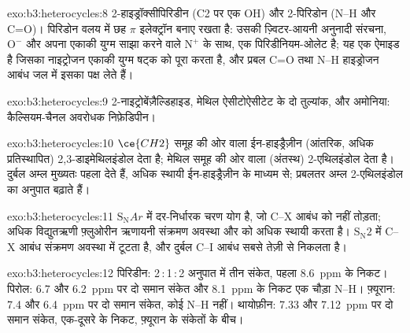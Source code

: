 \begin{solution}{exo:b3:heterocycles:8}
2-हाइड्रॉक्सीपिरिडीन (C2 पर एक OH) और 2-पिरिडोन (N--H और C=O)। पिरिडोन वलय में छह
$\pi$ इलेक्ट्रॉन बनाए रखता है: उसकी ज़्विटर-आयनी अनुनादी संरचना, $\mathrm{O^-}$ और अपना एकाकी युग्म साझा करने वाले
$\mathrm{N^+}$ के साथ, एक पिरिडीनियम-ओलेट है; यह एक ऐमाइड है जिसका
नाइट्रोजन एकाकी युग्म षट्क को पूरा करता है, और प्रबल C=O तथा N--H
हाइड्रोजन आबंध जल में इसका पक्ष लेते हैं।
\end{solution}

\begin{solution}{exo:b3:heterocycles:9}
2-नाइट्रोबेंज़ैल्डिहाइड, मेथिल ऐसीटोऐसीटेट के दो तुल्यांक, और अमोनिया:
कैल्सियम-चैनल अवरोधक निफ़ेडिपीन।
\end{solution}

\begin{solution}{exo:b3:heterocycles:10}
$\ce{CH2}$ समूह की ओर वाला ईन-हाइड्रैज़ीन (आंतरिक, अधिक प्रतिस्थापित)
2,3-डाइमेथिलइंडोल देता है; मेथिल समूह की ओर वाला (अंतस्थ) 2-एथिलइंडोल देता है।
दुर्बल अम्ल मुख्यतः पहला देते हैं, अधिक स्थायी ईन-हाइड्रैज़ीन के माध्यम से;
प्रबलतर अम्ल 2-एथिलइंडोल का अनुपात बढ़ाते हैं।
\end{solution}

\begin{solution}{exo:b3:heterocycles:11}
$\mathrm S_\mathrm NAr$ में दर-निर्धारक चरण योग है, जो C--X
आबंध को नहीं तोड़ता; अधिक विद्युतऋणी फ़्लुओरीन ऋणायनी संक्रमण अवस्था
और  को अधिक स्थायी करता है। $\mathrm S_\mathrm N2$ में C--X आबंध
संक्रमण अवस्था में टूटता है, और दुर्बल C--I आबंध सबसे तेज़ी से निकलता है।
\end{solution}

\begin{solution}{exo:b3:heterocycles:12}
पिरिडीन: 2\,:\,1\,:\,2 अनुपात में तीन संकेत, पहला \qty{8.6}{ppm} के निकट। पिरोल: 6.7 और \qty{6.2}{ppm} पर
दो समान संकेत और \qty{8.1}{ppm} के निकट एक चौड़ा N--H। फ़्यूरान: 7.4 और \qty{6.4}{ppm} पर दो समान संकेत,
कोई N--H नहीं। थायोफ़ीन: 7.33 और \qty{7.12}{ppm} पर दो समान संकेत, एक-दूसरे के
निकट, फ़्यूरान के संकेतों के बीच।
\end{solution}

